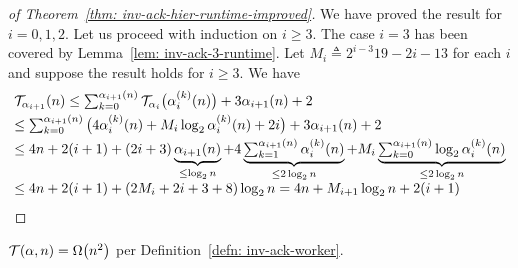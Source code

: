 \begin{proof}[of Theorem~\ref{thm: inv-ack-hier-runtime-improved}]
	We have proved the result for $i = 0, 1, 2$. Let us proceed with induction on $i\ge 3$. The case $i = 3$ has been covered by Lemma~\ref{lem: inv-ack-3-runtime}. Let $M_i \triangleq 2^{i-3}19 - 2i - 13$ for each $i$ and suppose the result holds for $i\ge 3$. We have
	\begin{equation*}
	\begin{array}{@{}l@{}}
	 \runtime_{\alpha_{i+1}}(n) \le \sum_{k=0}^{\alpha_{i+1}(n)} \runtime_{\alpha_i}\big(\alpha_i^{(k)}(n)\big) + 3\alpha_{i+1}(n) + 2 \\[3pt]
	\le \sum_{k=0}^{\alpha_{i+1}(n)}\big(4\alpha_i^{(k)}(n) + M_i\log_2\alpha_i^{(k)}(n) + 2i \big) + 3\alpha_{i+1}(n) + 2 \\[3pt]
  \le 4n + 2(i+1) + (2i + 3)\underbrace{\alpha_{i+1}(n)}_{\le \log_2n} + 4\underbrace{\textstyle \sum_{k=1}^{\alpha_{i+1}(n)}\alpha_i^{(k)}(n)}_{\le 2\log_2n} + M_i\underbrace{\textstyle \sum_{k=0}^{\alpha_{i+1}(n)}\log_2\alpha_i^{(k)}(n)}_{\le 2\log_2n} \\[3pt]
	\le 4n + 2(i+1) + (2M_i + 2i + 3 + 8)\log_2n
	= 4n + M_{i+1}\log_2n + 2(i+1)
	\end{array}
	\end{equation*}
\end{proof}

\begin{col}
	$\mathcal{T}(\alpha, n) = \Omega\big(n^2\big)$ per Definition~\ref{defn: inv-ack-worker}.
\end{col}
